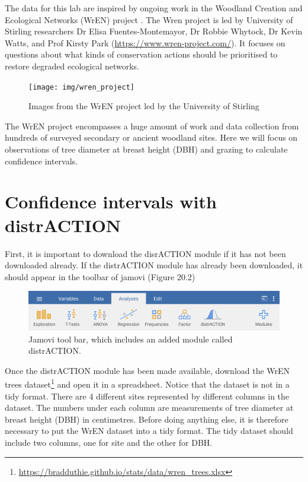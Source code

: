 \documentclass[
]{scrbook}
\begin{document}
The data for this lab are inspired by ongoing work in the Woodland Creation and Ecological Networks (WrEN) project \citep{Fuentes-Montemayor2022, Fuentes-Montemayor2022a}.
The Wren project is led by University of Stirling researchers Dr Elisa Fuentes-Montemayor, Dr Robbie Whytock, Dr Kevin Watts, and Prof Kirsty Park (\url{https://www.wren-project.com/}).
It focuses on questions about what kinds of conservation actions should be prioritised to restore degraded ecological networks.

\begin{figure}
\texttt{[image: img/wren\_project]} \caption{Images from the WrEN project led by the University of Stirling}\label{fig:unnamed-chunk-88}
\end{figure}

The WrEN project encompasses a huge amount of work and data collection from hundreds of surveyed secondary or ancient woodland sites.
Here we will focus on observations of tree diameter at breast height (DBH) and grazing to calculate confidence intervals.

\hypertarget{confidence-intervals-with-distraction}{%
\section{Confidence intervals with distrACTION}\label{confidence-intervals-with-distraction}}

First, it is important to download the disrACTION module if it has not been downloaded already.
If the distrACTION module has already been downloaded, it should appear in the toolbar of jamovi (Figure 20.2)

\begin{figure}
\includegraphics[width=1\linewidth]{img/jamovi_toolbar_modules_distrACTION} \caption{Jamovi tool bar, which includes an added module called distrACTION.}\label{fig:unnamed-chunk-89}
\end{figure}

Once the distrACTION module has been made available, download the WrEN trees dataset\footnote{\url{https://bradduthie.github.io/stats/data/wren_trees.xlsx}} and open it in a spreadsheet.
Notice that the dataset is not in a tidy format.
There are 4 different sites represented by different columns in the dataset.
The numbers under each column are measurements of tree diameter at breast height (DBH) in centimetres.
Before doing anything else, it is therefore necessary to put the WrEN dataset into a tidy format.
The tidy dataset should include two columns, one for site and the other for DBH.
\end{document}
